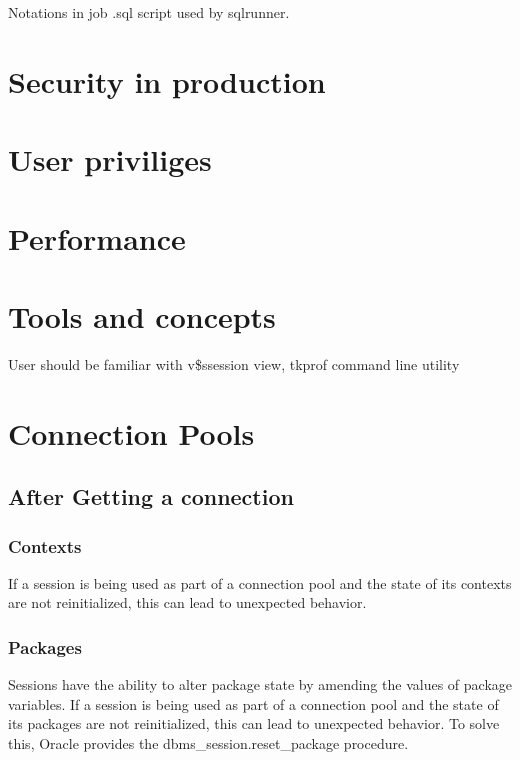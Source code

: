 \documentclass[letterpaper,10pt,english]{sphinxmanual}
\begin{document}
Notations in job .sql script used by sqlrunner.


\chapter{Security in production}
\label{index:security-in-production}

\chapter{User priviliges}
\label{index:user-priviliges}

\chapter{Performance}
\label{index:performance}

\chapter{Tools and concepts}
\label{index:tools-and-concepts}
User should be familiar with v\$ssession view, tkprof command line
utility


\chapter{Connection Pools}
\label{index:connection-pools}

\section{After Getting a connection}
\label{index:after-getting-a-connection}

\subsection{Contexts}
\label{index:contexts}
If a session is being used as part of a connection pool and the state of
its contexts are not reinitialized, this can lead to unexpected
behavior.


\subsection{Packages}
\label{index:packages}
Sessions have the ability to alter package state by amending the values
of package variables. If a session is being used as part of a connection
pool and the state of its packages are not reinitialized, this can lead
to unexpected behavior. To solve this, Oracle provides the
dbms\_session.reset\_package procedure.
\end{document}
